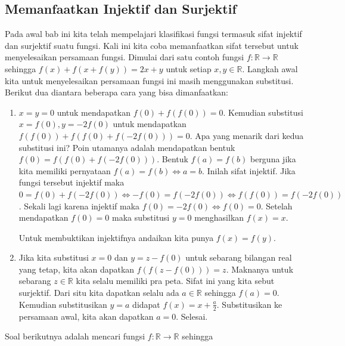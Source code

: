 \documentclass{article}
\begin{document}
\subsection{Memanfaatkan Injektif dan Surjektif}
Pada awal bab ini kita telah mempelajari klasifikasi fungsi termasuk sifat injektif dan surjektif suatu fungsi. Kali ini kita coba memanfaatkan sifat tersebut untuk menyelesaikan persamaan fungsi. Dimulai dari satu contoh fungsi $f : \mathbb{R} \rightarrow \mathbb{R}$ sehingga $f(x)+f(x+f(y)) = 2x+y$ untuk setiap $x, y \in \mathbb{R}$. Langkah awal kita untuk menyelesaikan persamaan fungsi ini masih menggunakan substitusi. Berikut dua diantara beberapa cara yang bisa dimanfaatkan:
\begin{enumerate}
\item $x = y = 0$ untuk mendapatkan $f(0)+f(f(0)) = 0$. Kemudian substitusi $x = f(0), y = -2f(0)$ untuk mendapatkan $f(f(0))+f(f(0)+f(-2f(0))) = 0$. Apa yang menarik dari kedua substitusi ini? Poin utamanya adalah mendapatkan bentuk $f(0) = f(f(0)+f(-2f(0)))$. Bentuk $f(a) = f(b)$ berguna jika kita memiliki pernyataan $f(a) = f(b) \iff a = b$. Inilah sifat injektif. Jika fungsi tersebut injektif maka $0 = f(0)+f(-2f(0)) \iff -f(0) = f(-2f(0)) \iff f(f(0)) = f(-2f(0))$. Sekali lagi karena injektif maka $f(0) = -2f(0) \iff f(0) = 0$. Setelah mendapatkan $f(0) = 0$ maka substitusi $y = 0$ menghasilkan $f(x) = x$.

Untuk membuktikan injektifnya andaikan kita punya $f(x) = f(y)$.

\item Jika kita substitusi $x = 0$ dan $y = z - f(0)$ untuk sebarang bilangan real yang tetap, kita akan dapatkan $f(f(z-f(0))) = z$. Maknanya untuk sebarang $z \in \mathbb{R}$ kita selalu memiliki pra peta. Sifat ini yang kita sebut surjektif. Dari situ kita dapatkan selalu ada $a \in \mathbb{R}$ sehingga $f(a) = 0$. Kemudian substitusikan $y = a$ didapat $f(x) = x + \frac{a}{2}$. Substitusikan ke persamaan awal, kita akan dapatkan $a = 0$. Selesai.


\end{enumerate}

Soal berikutnya adalah mencari fungsi $f : \mathbb{R} \rightarrow \mathbb{R}$ sehingga
\end{document}
